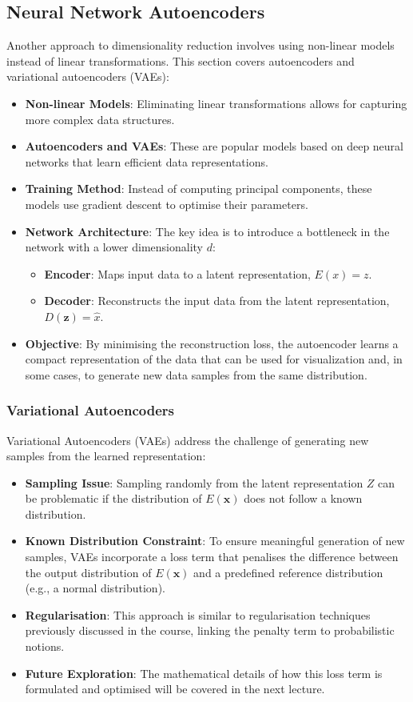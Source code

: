 \subsection{Neural Network Autoencoders}

Another approach to dimensionality reduction involves using non-linear models instead of linear transformations. This section covers autoencoders and variational autoencoders (VAEs):
\begin{itemize}
    \item \textbf{Non-linear Models}: Eliminating linear transformations allows for capturing more complex data structures.
    \item \textbf{Autoencoders and VAEs}: These are popular models based on deep neural networks that learn efficient data representations.
    \item \textbf{Training Method}: Instead of computing principal components, these models use gradient descent to optimise their parameters.
    \item \textbf{Network Architecture}: The key idea is to introduce a bottleneck in the network with a lower dimensionality $d$:
    \begin{itemize}
        \item \textbf{Encoder}: Maps input data to a latent representation, $E(x) = z$.
        \item \textbf{Decoder}: Reconstructs the input data from the latent representation, $D(\boldsymbol{z}) = \hat{x}$.
    \end{itemize}
    \item \textbf{Objective}: By minimising the reconstruction loss, the autoencoder learns a compact representation of the data that can be used for visualization and, in some cases, to generate new data samples from the same distribution.
\end{itemize}

\subsubsection{Variational Autoencoders}

Variational Autoencoders (VAEs) address the challenge of generating new samples from the learned representation:
\begin{itemize}
    \item \textbf{Sampling Issue}: Sampling randomly from the latent representation $Z$ can be problematic if the distribution of $E(\boldsymbol{x})$ does not follow a known distribution.
    \item \textbf{Known Distribution Constraint}: To ensure meaningful generation of new samples, VAEs incorporate a loss term that penalises the difference between the output distribution of $E(\boldsymbol{x})$ and a predefined reference distribution (e.g., a normal distribution).
    \item \textbf{Regularisation}: This approach is similar to regularisation techniques previously discussed in the course, linking the penalty term to probabilistic notions.
    \item \textbf{Future Exploration}: The mathematical details of how this loss term is formulated and optimised will be covered in the next lecture.
\end{itemize}
